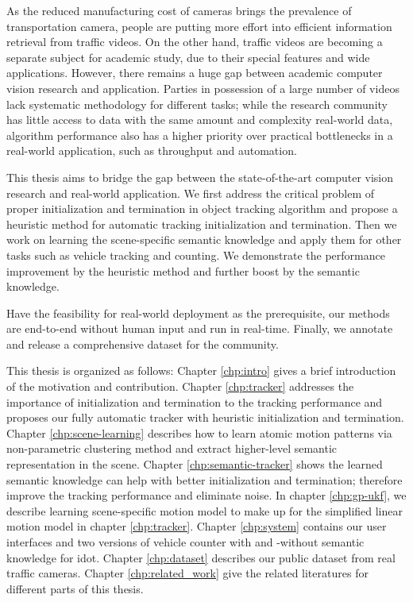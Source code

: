 \summary

As the reduced manufacturing cost of cameras brings the prevalence of transportation camera, people are putting more effort into efficient information retrieval from traffic videos.
On the other hand, traffic videos are becoming a separate subject for academic study, due to their special features and wide applications.
However, there remains a huge gap between academic computer vision research and application. 
Parties in possession of a large number of videos lack systematic methodology for different tasks;
while the research community has little access to data with the same amount and complexity real-world data, algorithm performance also has a higher priority over practical bottlenecks in a real-world application, such as throughput and automation.

This thesis aims to bridge the gap between the state-of-the-art computer vision research and real-world application.
We first address the critical problem of proper initialization and termination in object tracking algorithm and propose a heuristic method for automatic tracking initialization and termination.
Then we work on learning the scene-specific semantic knowledge and apply them for other tasks such as vehicle tracking and counting.
We demonstrate the performance improvement by the heuristic method and further boost by the semantic knowledge.

Have the feasibility for real-world deployment as the prerequisite, our methods are end-to-end without human input and run in real-time. 
Finally, we annotate and release a comprehensive dataset for the community. 

This thesis is organized as follows: 
Chapter \ref{chp:intro} gives a brief introduction of the motivation and contribution.
Chapter \ref{chp:tracker} addresses the importance of initialization and termination to the tracking performance and proposes our fully automatic tracker with heuristic initialization and termination. 
Chapter \ref{chp:scene-learning} describes how to learn atomic motion patterns via non-parametric clustering method and extract higher-level semantic representation in the scene.
Chapter \ref{chp:semantic-tracker} shows the learned semantic knowledge can help with better initialization and termination; therefore improve the tracking performance and eliminate noise.
In chapter \ref{chp:gp-ukf}, we describe learning scene-specific motion model to make up for the simplified linear motion model in chapter \ref{chp:tracker}.
Chapter \ref{chp:system} contains our user interfaces and two versions of vehicle counter with and -without semantic knowledge for \gls{idot}.
Chapter \ref{chp:dataset} describes our public dataset from real traffic cameras.
Chapter \ref{chp:related_work} give the related literatures for different parts of this thesis.

